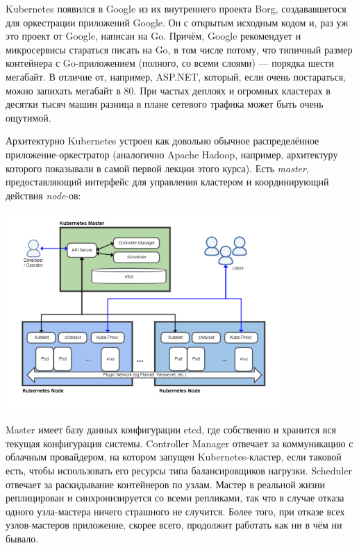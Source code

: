 \documentclass{../../text-style}
\begin{document}
Kubernetes появился в Google из их внутреннего проекта Borg, создававшегося для оркестрации приложений Google. Он с открытым исходным кодом и, раз уж это проект от Google, написан на Go. Причём, Google рекомендует и микросервисы стараться писать на Go, в том числе потому, что типичный размер контейнера с Go-приложением (полного, со всеми слоями) --- порядка шести мегабайт. В отличие от, например, ASP.NET, который, если очень постараться, можно запихать мегабайт в 80. При частых деплоях и огромных кластерах в десятки тысяч машин разница в плане сетевого трафика может быть очень ощутимой.

Архитектурно Kubernetes устроен как довольно обычное распределённое приложение-оркестратор (аналогично Apache Hadoop, например, архитектуру которого показывали в самой первой лекции этого курса). Есть \emph{master}, предоставляющий интерфейс для управления кластером и координирующий действия \emph{node}-ов:

\begin{center}
    \includegraphics[width=0.8\textwidth]{kubernetesArchitecture.png}
\end{center}

Master имеет базу данных конфигурации etcd, где собственно и хранится вся текущая конфигурация системы. Controller Manager отвечает за коммуникацию с облачным провайдером, на котором запущен Kubernetes-кластер, если таковой есть, чтобы использовать его ресурсы типа балансировщиков нагрузки. Scheduler отвечает за раскидывание контейнеров по узлам. Мастер в реальной жизни реплицирован и синхронизируется со всеми репликами, так что в случае отказа одного узла-мастера ничего страшного не случится. Более того, при отказе всех узлов-мастеров приложение, скорее всего, продолжит работать как ни в чём ни бывало.
\end{document}
